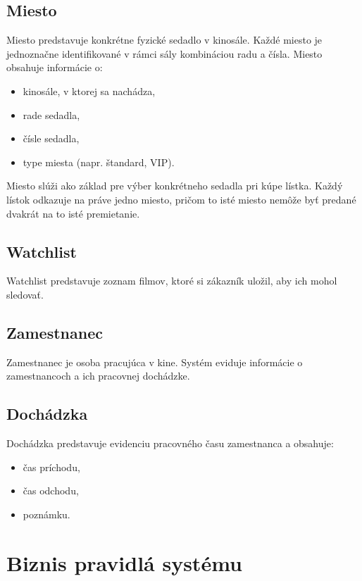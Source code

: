 \documentclass[11pt, a4paper]{article}
\begin{document}
\subsection{Miesto}

Miesto predstavuje konkrétne fyzické sedadlo v kinosále. Každé miesto je jednoznačne
identifikované v rámci sály kombináciou radu a čísla. Miesto obsahuje informácie o:

\begin{itemize}
    \item kinosále, v ktorej sa nachádza,
    \item rade sedadla,
    \item čísle sedadla,
    \item type miesta (napr. štandard, VIP).
\end{itemize}

Miesto slúži ako základ pre výber konkrétneho sedadla pri kúpe lístka. Každý lístok odkazuje
na práve jedno miesto, pričom to isté miesto nemôže byť predané dvakrát na to isté
premietanie.

\subsection{Watchlist}
Watchlist predstavuje zoznam filmov, ktoré si zákazník uložil, aby ich mohol sledovať.

\subsection{Zamestnanec}
Zamestnanec je osoba pracujúca v kine. Systém eviduje informácie o zamestnancoch a ich
pracovnej dochádzke.

\subsection{Dochádzka}
Dochádzka predstavuje evidenciu pracovného času zamestnanca a obsahuje:
\begin{itemize}
    \item čas príchodu,
    \item čas odchodu,
    \item poznámku.
\end{itemize}

\section{Biznis pravidlá systému}
\label{sec:biznis-pravidla}
\end{document}
